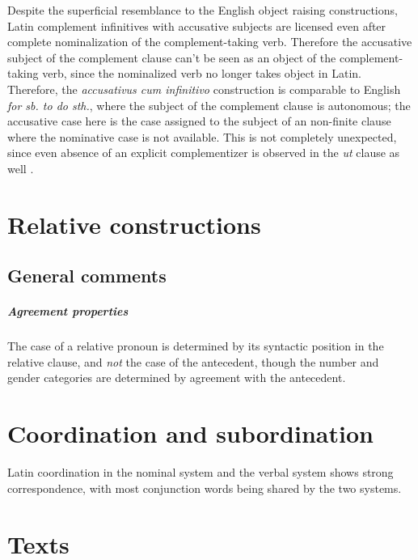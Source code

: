 \documentclass[a4paper, oneside, 12pt]{report}
\newcommand*{\citepages}[1]{pp.~{#1}}
\newcommand{\form}[1]{\emph{#1}}
\begin{document}
Despite the superficial resemblance to the English object raising constructions,
Latin complement infinitives with accusative subjects 
are licensed even after complete nominalization
of the complement-taking verb.
Therefore the accusative subject of the complement clause 
can't be seen as an object of the complement-taking verb, 
since the nominalized verb no longer takes object in Latin.
Therefore, the \form{accusativus cum infinitivo} construction 
is comparable to English \form{for sb. to do sth.},
where the subject of the complement clause is autonomous;
the accusative case here is the case assigned to 
the subject of an non-finite clause where the nominative case is not available.
This is not completely unexpected, 
since even absence of an explicit complementizer 
is observed in the \form{ut} clause as well
\citep[\citepages{290-292}]{oniga2014latin}.

\chapter{Relative constructions}\label{chap:relative-clause}

\section{General comments}

\paragraph*{Agreement properties}\label{sec:relative-clause.overview.agreement}

The case of a relative pronoun is determined 
by its syntactic position in the relative clause, 
and \emph{not} the case of the antecedent,
though the number and gender categories 
are determined by agreement with the antecedent.

\chapter{Coordination and subordination}

Latin coordination in the nominal system and the verbal system 
shows strong correspondence,
with most conjunction words being shared
by the two systems.



\chapter{Texts}
\end{document}
